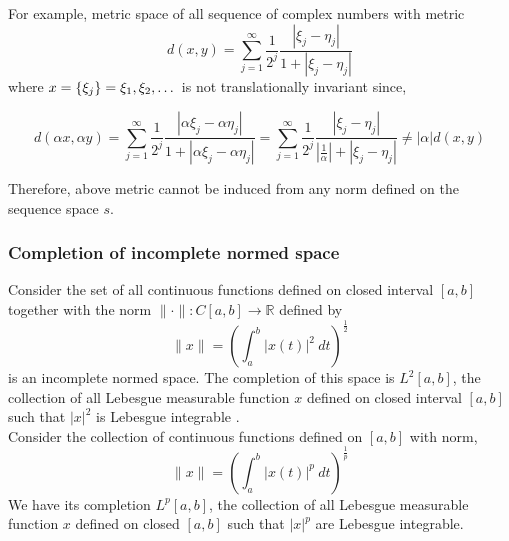 	For example, metric space of all sequence of complex numbers with metric
	$$d(x,y) = \sum_{j = 1}^\infty \frac{1}{2^j} \frac{|\xi_j-\eta_j|}{1+|\xi_j-\eta_j|}$$
	where $x = \{\xi_j\} = \xi_1,\xi_2,\dots$ is not translationally invariant since,

	$$ d(\alpha x, \alpha y) = \sum_{j = 1}^\infty \frac{1}{2^j} \frac{|\alpha\xi_j-\alpha\eta_j|}{1+|\alpha\xi_j - \alpha\eta_j|} = \sum_{j=1}^\infty \frac{1}{2^j} \frac{|\xi_j - \eta_j|}{\left|\frac{1}{\alpha}\right|+|\xi_j-\eta_j|} \ne |\alpha| d(x,y) $$

	Therefore, above metric cannot be induced from any norm defined on the sequence space $s$.
	
\subsubsection{Completion of incomplete normed space}
	Consider the set of all continuous functions defined on closed interval $[a,b]$ together with the norm $\| \cdot \| : C[a,b] \to \mathbb{R}$ defined by
	$$ \|x\| = \left( \int_a^b |x(t)|^2\ dt \right)^\frac{1}{2}$$
	is an incomplete normed space.
	The completion of this space is $L^2[a,b]$, the collection of all Lebesgue measurable function $x$ defined on closed interval $[a,b]$ such that $|x|^2$ is Lebesgue integrable .\\

	Consider the collection of continuous functions defined on $[a,b]$ with norm,
	$$\|x\| = \left( \int_a^b |x(t)|^p\ dt \right)^\frac{1}{p}$$
	We have its completion $L^p[a,b]$, the collection of all Lebesgue measurable function $x$ defined on closed $[a,b]$ such that $|x|^p$ are Lebesgue integrable.

